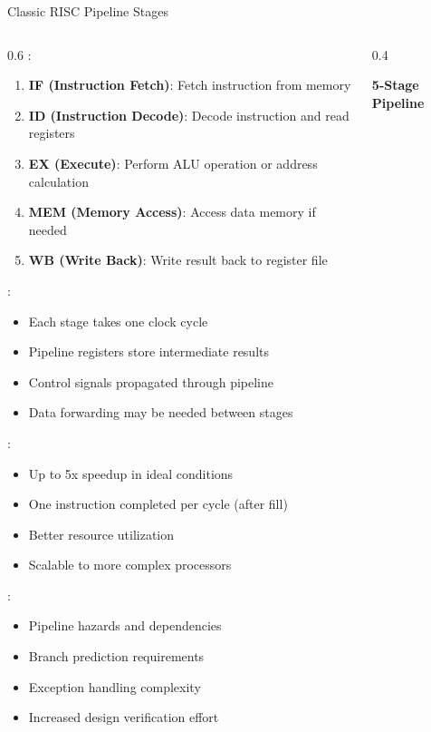 \begin{frame}{Classic RISC Pipeline Stages}
\begin{columns}
\begin{column}{0.6\textwidth}
:
\begin{enumerate}
\item \textbf{IF (Instruction Fetch)}: Fetch instruction from memory
\item \textbf{ID (Instruction Decode)}: Decode instruction and read registers
\item \textbf{EX (Execute)}: Perform ALU operation or address calculation
\item \textbf{MEM (Memory Access)}: Access data memory if needed
\item \textbf{WB (Write Back)}: Write result back to register file
\end{enumerate}

\vspace{0.3cm}
:
\begin{itemize}
\item Each stage takes one clock cycle
\item Pipeline registers store intermediate results
\item Control signals propagated through pipeline
\item Data forwarding may be needed between stages
\end{itemize}

\vspace{0.3cm}
:
\begin{itemize}
\item Up to 5x speedup in ideal conditions
\item One instruction completed per cycle (after fill)
\item Better resource utilization
\item Scalable to more complex processors
\end{itemize}

\vspace{0.3cm}
:
\begin{itemize}
\item Pipeline hazards and dependencies
\item Branch prediction requirements
\item Exception handling complexity
\item Increased design verification effort
\end{itemize}
\end{column}
\begin{column}{0.4\textwidth}
\begin{center}
\textbf{5-Stage Pipeline}
\vspace{0.3cm}


\end{center}
\end{column}
\end{columns}
\end{frame}
